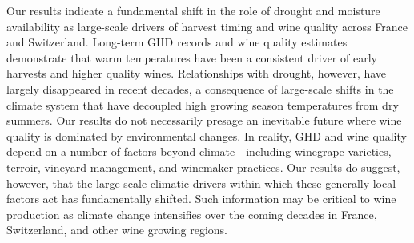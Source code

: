 \documentclass[final]{nature}
\begin{document}
\indent Our results indicate a fundamental shift in the role of drought and moisture availability as large-scale drivers of harvest timing and wine quality across France and Switzerland. Long-term GHD records and wine quality estimates demonstrate that warm temperatures have been a consistent driver of early harvests and higher quality wines. Relationships with drought, however, have largely disappeared in recent decades, a consequence of large-scale shifts in the climate system that have decoupled high growing season temperatures from dry summers. Our results do not necessarily presage an inevitable future where wine quality is dominated by environmental changes. In reality, GHD and wine quality depend on a number of factors beyond climate---including winegrape varieties, terroir, vineyard management, and winemaker practices\cite{Jackson1993,Leeuwen2013}. Our results do suggest, however, that the large-scale climatic drivers within which these generally local factors act has fundamentally shifted. Such information may be critical to wine production as climate change intensifies over the coming decades in France, Switzerland, and other wine growing regions.

\end{document}
